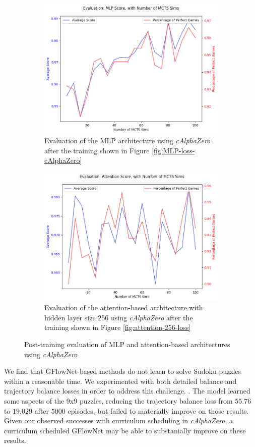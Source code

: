 \documentclass[10pt, reqno, letterpaper, twoside]{amsart}
\begin{document}
\begin{figure}
    \centering
    \begin{subfigure}{0.45\textwidth}
        \includegraphics[width=0.8\linewidth]{images/eval_mlp.png}
        \caption{Evaluation of the MLP architecture using \textit{cAlphaZero} after the training shown in Figure \ref{fig:MLP-loss-cAlphaZero}}
    \end{subfigure}
    \hfill
    \begin{subfigure}{0.45\textwidth}
        \includegraphics[width=0.8\linewidth]{images/eval_attention.png}
        \caption{Evaluation of the attention-based architecture with hidden layer size 256 using \textit{cAlphaZero} after the training shown in Figure \ref{fig:attention-256-loss}}
    \end{subfigure}
    \caption{Post-training evaluation of MLP and attention-based architectures using \textit{cAlphaZero}}
    \label{fig:MLP-loss}
\end{figure}


We find that GFlowNet-based methods do not learn to solve Sudoku puzzles within a reasonable time.   We experimented with both detailed balance and trajectory balance losses in order to address this challenge. \cite{https://doi.org/10.15488/13422}.  The model learned some aspects of the 9x9 puzzles, reducing the trajectory balance loss from $55.76$ to $19.029$ after $5000$ episodes, but failed to materially improve on those results.  Given our observed successes with curriculum scheduling in \textit{cAlphaZero}, a curriculum scheduled GFlowNet may be able to substanially improve on these results.
\end{document}
